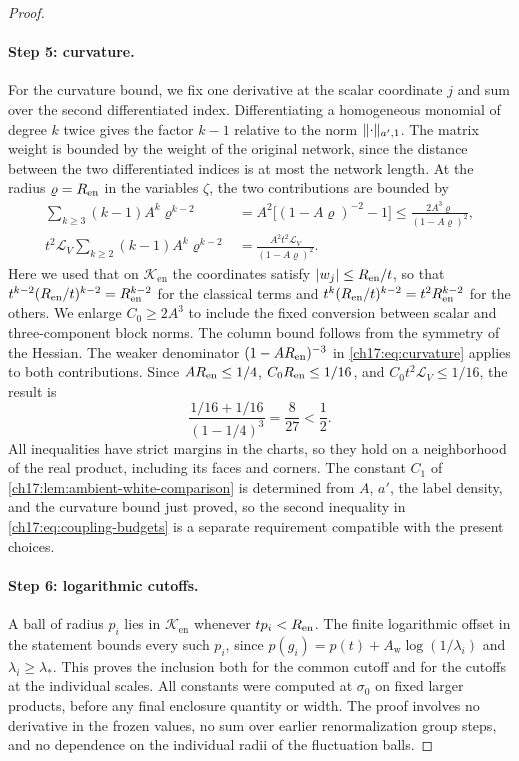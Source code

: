 \begin{proof}
\paragraph{Step 5: curvature.}
For the curvature bound, we fix one derivative at the scalar coordinate $j$ and sum over the second differentiated index. Differentiating a homogeneous monomial of degree $k$ twice gives the factor $k-1$ relative to the norm $\lVert \cdot\rVert_{a',1}$. The matrix weight is bounded by the weight of the original network, since the distance between the two differentiated indices is at most the network length. At the radius $\varrho=R_{\mathrm{en}}$ in the variables $\zeta$, the two contributions are bounded by
\begin{align*}
 \sum_{k\ge3}(k-1)A^k\varrho^{k-2}&=A^2\bigl[(1-A\varrho)^{-2}-1\bigr]\le\frac{2A^3\varrho}{(1-A\varrho)^2},\\
 t^2\mathcal L_V\sum_{k\ge2}(k-1)A^k\varrho^{k-2}&=\frac{A^2t^2\mathcal L_V}{(1-A\varrho)^2}.
\end{align*}
Here we used that on $\mathcal K_{\mathrm{en}}$ the coordinates satisfy $\lvert w_j\rvert\le R_{\mathrm{en}}/t$, so that $t^{k-2}(R_{\mathrm{en}}/t)^{k-2}=R_{\mathrm{en}}^{k-2}$ for the classical terms and $t^k(R_{\mathrm{en}}/t)^{k-2}=t^2R_{\mathrm{en}}^{k-2}$ for the others. We enlarge $C_0\ge2A^3$ to include the fixed conversion between scalar and three-component block norms. The column bound follows from the symmetry of the Hessian. The weaker denominator $(1-AR_{\mathrm{en}})^{-3}$ in \eqref{ch17:eq:curvature} applies to both contributions. Since $AR_{\mathrm{en}}\le1/4$, $C_0R_{\mathrm{en}}\le1/16$, and $C_0t^2\mathcal L_V\le1/16$, the result is
\[
 \frac{1/16+1/16}{(1-1/4)^3}=\frac8{27}<\frac12.
\]
All inequalities have strict margins in the charts, so they hold on a neighborhood of the real product, including its faces and corners. The constant $C_1$ of \cref{ch17:lem:ambient-white-comparison} is determined from $A$, $a'$, the label density, and the curvature bound just proved, so the second inequality in \eqref{ch17:eq:coupling-budgets} is a separate requirement compatible with the present choices.

\paragraph{Step 6: logarithmic cutoffs.}
A ball of radius $p_i$ lies in $\mathcal K_{\mathrm{en}}$ whenever $tp_i<R_{\mathrm{en}}$. The finite logarithmic offset in the statement bounds every such $p_i$, since $p(g_i)=p(t)+A_{\mathrm w}\log(1/\lambda_i)$ and $\lambda_i\ge\lambda_*$. This proves the inclusion both for the common cutoff and for the cutoffs at the individual scales. All constants were computed at $\sigma_0$ on fixed larger products, before any final enclosure quantity or width. The proof involves no derivative in the frozen values, no sum over earlier renormalization group steps, and no dependence on the individual radii of the fluctuation balls.
\end{proof}

